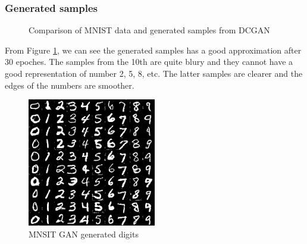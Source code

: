 \documentclass{article}
\begin{document}
\subsubsection{Generated samples}

\begin{figure}[!htb]
  \centering
  \caption{Comparison of MNIST data and generated samples from DCGAN}
  \label{fig_DCGAN_MNIST}
\end{figure}

From Figure \ref{fig_DCGAN_MNIST}, 
we can see the generated samples has a good approximation after 30 epoches.
The samples from the 10th are quite blury and they cannot have a good representation of number 2, 5, 8, etc.
The latter samples are clearer and the edges of the numbers are smoother.

\begin{figure}[!htb]
  \centering
  \includegraphics[width=0.5\textwidth]{imgs/MNIST_digits.png}
  \caption{MNSIT GAN generated digits}
  \label{fig_MNSIT_digits}
\end{figure}
\end{document}
